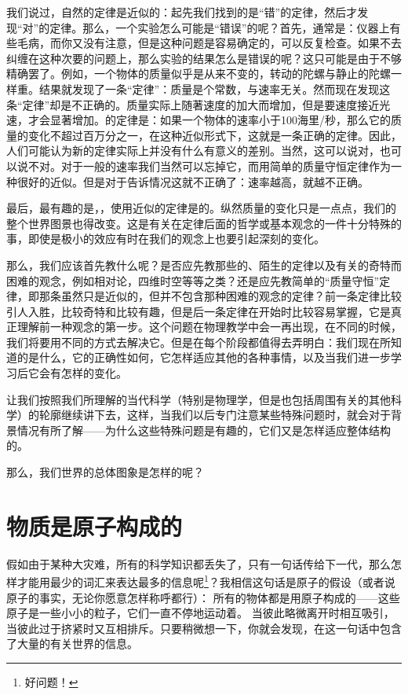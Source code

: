 \documentclass[12pt,oneside]{book}
\begin{document}
\begin{common-format}
我们说过，自然的定律是近似的：起先我们找到的是“错”的定律，然后才发现“对”的定律。那么，一个实验怎么可能是“错误”的呢？首先，通常是：仪器上有些毛病，而你又没有注意，但是这种问题是容易确定的，可以反复检查。如果不去纠缠在这种次要的问题上，那么实验的结果怎么是错误的呢？这只可能是由于不够精确罢了。例如，一个物体的质量似乎是从来不变的，转动的陀螺与静止的陀螺一样重。结果就发现了一条“定律”：质量是个常数，与速率无关。然而现在发现这条“定律”却是不正确的。质量实际上随著速度的加大而增加，但是要速度接近光速，才会显著增加。的定律是：如果一个物体的速率小于100海里/秒，那么它的质量的变化不超过百万分之一，在这种近似形式下，这就是一条正确的定律。因此，人们可能认为新的定律实际上并没有什么有意义的差别。当然，这可以说对，也可以说不对。对于一般的速率我们当然可以忘掉它，而用简单的质量守恒定律作为一种很好的近似。但是对于告诉情况这就不正确了：速率越高，就越不正确。

最后，最有趣的是，，使用近似的定律是的。纵然质量的变化只是一点点，我们的整个世界图景也得改变。这是有关在定律后面的哲学或基本观念的一件十分特殊的事，即使是极小的效应有时在我们的观念上也要引起深刻的变化。

那么，我们应该首先教什么呢？是否应先教那些的、陌生的定律以及有关的奇特而困难的观念，例如相对论，四维时空等等之类？还是应先教简单的“质量守恒”定律，即那条虽然只是近似的，但并不包含那种困难的观念的定律？前一条定律比较引人入胜，比较奇特和比较有趣，但是后一条定律在开始时比较容易掌握，它是真正理解前一种观念的第一步。这个问题在物理教学中会一再出现，在不同的时候，我们将要用不同的方式去解决它。但是在每个阶段都值得去弄明白：我们现在所知道的是什么，它的正确性如何，它怎样适应其他的各种事情，以及当我们进一步学习后它会有怎样的变化。

让我们按照我们所理解的当代科学（特别是物理学，但是也包括周围有关的其他科学）的轮廓继续讲下去，这样，当我们以后专门注意某些特殊问题时，就会对于背景情况有所了解——为什么这些特殊问题是有趣的，它们又是怎样适应整体结构的。

那么，我们世界的总体图象是怎样的呢？


\section{物质是原子构成的}
假如由于某种大灾难，所有的科学知识都丢失了，只有一句话传给下一代，那么怎样才能用最少的词汇来表达最多的信息呢\footnote{好问题！}？我相信这句话是原子的假设（或者说原子的事实，无论你愿意怎样称呼都行）： 所有的物体都是用原子构成的——这些原子是一些小小的粒子，它们一直不停地运动着。 当彼此略微离开时相互吸引， 当彼此过于挤紧时又互相排斥。只要稍微想一下，你就会发现，在这一句话中包含了大量的有关世界的信息。


\end{common-format}
\end{document}
